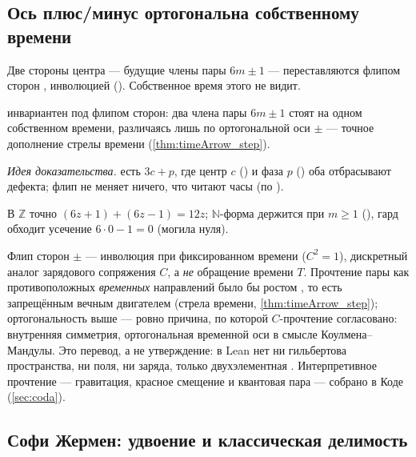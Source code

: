 \subsection{Ось плюс/минус ортогональна собственному времени}

Две стороны центра --- будущие члены пары $6m\pm1$ --- переставляются флипом сторон ,
инволюцией (). Собственное время этого не видит.

\begin{theorem}\label{thm:lexRank_side_invariant}
\green{}  инвариантен под флипом сторон: два члена пары $6m\pm1$ стоят на одном
собственном времени, различаясь лишь по ортогональной оси $\pm$ --- точное дополнение стрелы времени
(\cref{thm:timeArrow_step}).
\end{theorem}

\emph{Идея доказательства.}  есть $3c+p$, где центр $c$ () и фаза $p$
() оба отбрасывают  дефекта; флип не меняет ничего, что читают часы (по
).

\begin{theorem}\label{thm:signedSideValue_reflection_sum}
\green{} В $\mathbb{Z}$ точно $(6z+1)+(6z-1)=12z$; $\mathbb{N}$-форма держится при $m\ge 1$
(), гард обходит усечение $6\cdot 0-1=0$ (могила нуля).
\end{theorem}

\begin{remark}
Флип сторон $\pm$ --- инволюция при фиксированном времени ($C^2=1$), дискретный аналог зарядового
сопряжения $C$, а \emph{не} обращение времени $T$. Прочтение пары как противоположных
\emph{временных} направлений было бы ростом , то есть запрещённым вечным двигателем
(стрела времени, \cref{thm:timeArrow_step}); ортогональность выше --- ровно причина, по которой
$C$-прочтение согласовано: внутренняя симметрия, ортогональная временной оси в смысле
Коулмена--Мандулы. Это перевод, а не утверждение: в Lean нет ни гильбертова пространства, ни поля, ни
заряда, только двухэлементная . Интерпретивное прочтение --- гравитация, красное смещение и
квантовая пара --- собрано в Коде (\cref{sec:coda}).
\end{remark}

\subsection{Софи Жермен: удвоение и классическая делимость}

